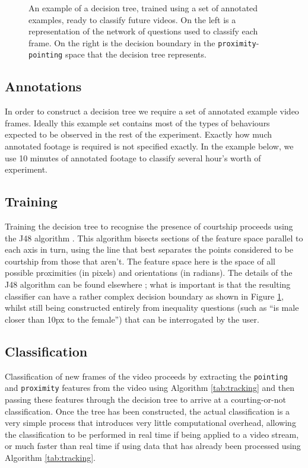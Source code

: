 \documentclass[twocolumn]{article}
\newcommand{\var}[1]{\texttt{#1}}
\begin{document}
\begin{figure}
	\caption{An example of a decision tree, trained using a set of annotated examples, ready to classify future videos. On the left is a representation of the network of questions used to classify each frame. On the right is the decision boundary in the \var{proximity}-\var{pointing} space that the decision tree represents.}
	\label{fig:decisiontree}
\end{figure}

\subsection{Annotations}

In order to construct a decision tree we require a set of annotated example video frames. Ideally this example set contains most of the types of  behaviours expected to be observed in the rest of the experiment. Exactly how much annotated footage is required is not specified exactly. In the example below, we use 10 minutes of annotated footage to classify several hour's worth of experiment.

\subsection{Training}

Training the decision tree to recognise the presence of courtship proceeds using the J48 algorithm \cite{weka}. This algorithm bisects sections of the feature space parallel to each axis in turn, using the line that best separates the points considered to be courtship from those that aren't. The feature space here is the space of all possible proximities (in pixels) and orientations (in radians). The details of the J48 algorithm can be found elsewhere \cite{Frank}; what is important is that the resulting classifier can have a rather complex decision boundary as shown in Figure \ref{fig:decisiontree}, whilst still being constructed entirely from inequality questions (such as ``is male closer than 10px to the female'') that can be interrogated by the user.

\subsection{Classification}

Classification of new frames of the video proceeds by extracting the \var{pointing} and \var{proximity} features from the video using Algorithm \ref{tab:tracking} and then passing these features through the decision tree to arrive at a courting-or-not classification. Once the tree has been constructed, the actual classification is a very simple process that introduces very little computational overhead, allowing the classification to be performed in real time if being applied to a video stream, or much faster than real time if using data that has already been processed using Algorithm \ref{tab:tracking}.
\end{document}
